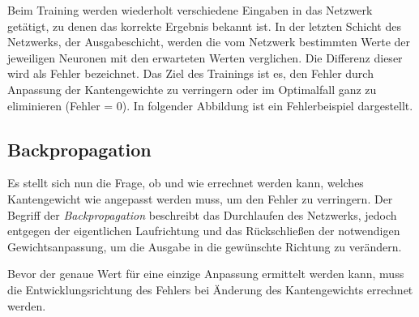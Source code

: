 Beim Training werden wiederholt verschiedene Eingaben in das Netzwerk getätigt,
zu denen das korrekte Ergebnis bekannt ist. In der letzten Schicht des Netzwerks,
der Ausgabeschicht, werden die vom Netzwerk bestimmten Werte der jeweiligen
Neuronen mit den erwarteten Werten verglichen.
Die Differenz dieser wird als Fehler bezeichnet.
Das Ziel des Trainings ist es, den Fehler durch Anpassung der Kantengewichte zu
verringern oder im Optimalfall ganz zu eliminieren (Fehler = 0).
In folgender Abbildung ist ein Fehlerbeispiel dargestellt.

\begin{figure}[H]
\end{figure}

\subsection{Backpropagation}

Es stellt sich nun die Frage, ob und wie errechnet werden kann, welches
Kantengewicht wie angepasst werden muss, um den Fehler zu verringern.
Der Begriff der \emph{Backpropagation} beschreibt das Durchlaufen des Netzwerks,
jedoch entgegen der eigentlichen Laufrichtung und das Rückschließen der
notwendigen Gewichtsanpassung, um die Ausgabe in die gewünschte Richtung zu
verändern.

Bevor der genaue Wert für eine einzige Anpassung ermittelt werden kann, muss
die Entwicklungsrichtung des Fehlers bei Änderung des Kantengewichts errechnet
werden.

